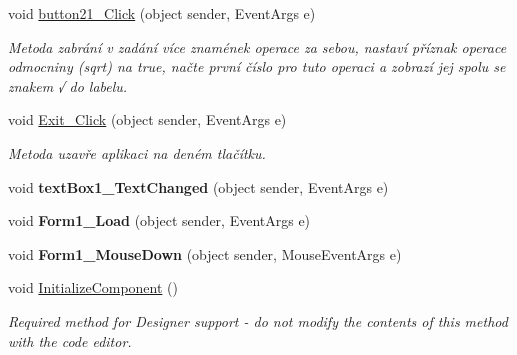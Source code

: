 \begin{DoxyCompactItemize}
void \hyperlink{class_windows_forms_application7_1_1_form1_a7d5f405d8a73d3ebf3719bbe353b5347}{button21\+\_\+\+Click} (object sender, Event\+Args e)
\begin{DoxyCompactList}\small\item\em Metoda zabrání v zadání více znamének operace za sebou, nastaví příznak operace odmocniny (sqrt) na true, načte první číslo pro tuto operaci a zobrazí jej spolu se znakem \textquotesingle{}√\textquotesingle{} do labelu. \end{DoxyCompactList}\item 
void \hyperlink{class_windows_forms_application7_1_1_form1_aa43c2856c44afb199010bddbcb20c645}{Exit\+\_\+\+Click} (object sender, Event\+Args e)
\begin{DoxyCompactList}\small\item\em Metoda uzavře aplikaci na deném tlačítku. \end{DoxyCompactList}\item 
void {\bfseries text\+Box1\+\_\+\+Text\+Changed} (object sender, Event\+Args e)\hypertarget{class_windows_forms_application7_1_1_form1_ac5e3c96c35111db5d1784a6f767b3eb4}{}\label{class_windows_forms_application7_1_1_form1_ac5e3c96c35111db5d1784a6f767b3eb4}

\item 
void {\bfseries Form1\+\_\+\+Load} (object sender, Event\+Args e)\hypertarget{class_windows_forms_application7_1_1_form1_ab5a9a2061ddb51fd956ae7a6e4e36017}{}\label{class_windows_forms_application7_1_1_form1_ab5a9a2061ddb51fd956ae7a6e4e36017}

\item 
void {\bfseries Form1\+\_\+\+Mouse\+Down} (object sender, Mouse\+Event\+Args e)\hypertarget{class_windows_forms_application7_1_1_form1_a0a831adb1b6d4ec3739a66592d83b6a8}{}\label{class_windows_forms_application7_1_1_form1_a0a831adb1b6d4ec3739a66592d83b6a8}

\item 
void \hyperlink{class_windows_forms_application7_1_1_form1_a9cc4356fccd25fe5fa780e9eb0a540cf}{Initialize\+Component} ()
\begin{DoxyCompactList}\small\item\em Required method for Designer support -\/ do not modify the contents of this method with the code editor. \end{DoxyCompactList}\end{DoxyCompactItemize}
